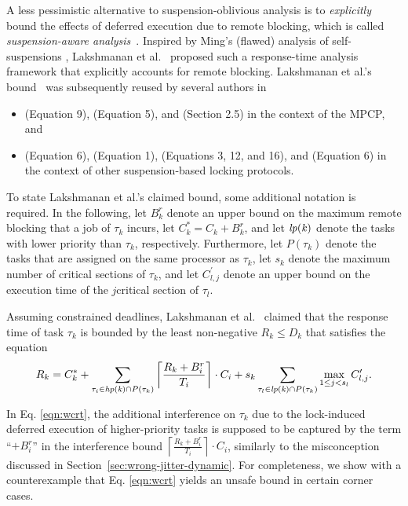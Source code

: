 A less pessimistic alternative to suspension-oblivious analysis is to \emph{explicitly} bound the effects of deferred execution due to remote blocking, which is called \emph{suspension-aware analysis}~\cite{BA:10b}. Inspired by Ming's (flawed) analysis of self-suspensions  \cite{MingLiRTCSA1994}, Lakshmanan et al.~\cite{lakshmanan-2009} proposed such a response-time analysis framework that explicitly accounts for remote blocking.  Lakshmanan et al.'s  bound~\cite{lakshmanan-2009} was subsequently reused by several authors in
\begin{itemize}
\item \cite{zeng-2011} (Equation 9), \cite{han-2014} (Equation 5), and \cite{yang-2014} (Section 2.5) in the context of the MPCP, and
\item \cite{yang-2013} (Equation 6), \cite{bbb-2013} (Equation 1), \cite{carminati-2014} (Equations 3, 12, and 16), and \cite{kim-2014} (Equation 6)  in the context of other suspension-based locking protocols.
\end{itemize}

To state  Lakshmanan et al.'s claimed bound, some additional notation is required. In the following, let $B_k^r$ denote an upper bound on the maximum remote blocking that a job of $\tau_k$ incurs, let $C_k^{\ast} = C_k + B_k^r$, and let $\mathit{lp(k)}$ denote the tasks with lower priority than $\tau_k$, respectively. Furthermore, let $P(\tau_k)$ denote the tasks that are assigned on the same processor as $\tau_k$, let $s_k$ denote the maximum number of critical sections of $\tau_k$, and let $C_{l,j}^{\prime}$ denote an upper bound on the execution time of the $j$\xth critical section of $\tau_l$.

Assuming constrained deadlines, Lakshmanan et al.~\cite{lakshmanan-2009} claimed that the response time of task $\tau_k$ is bounded by the least non-negative $R_k \leq D_k$ that satisfies the equation
\begin{equation}
\label{eqn:wcrt}
R_k = C_k^{\ast} + \sum_{\tau_i \in \mathit{hp(k)} \cap P(\tau_k)} \left \lceil \frac{R_k + B_i^r}{T_i} \right \rceil \cdot C_i + s_k \sum_{\tau_l \in \mathit{lp(k)} \cap P(\tau_k)} \max_{1 \leq j < s_l} C_{l,j}^{\prime}.
\end{equation}



In Eq. \eqref{eqn:wcrt}, the additional interference on $\tau_k$ due to the lock-induced deferred execution of higher-priority tasks is supposed to be captured by the term ``$+ B^r_i$'' in the interference bound  $\left \lceil \frac{R_k + B_i^r}{T_i} \right \rceil \cdot C_i$,  similarly to the misconception discussed in Section~\ref{sec:wrong-jitter-dynamic}. For completeness, we show with a counterexample that Eq. \eqref{eqn:wcrt} yields an unsafe bound in certain corner cases.

